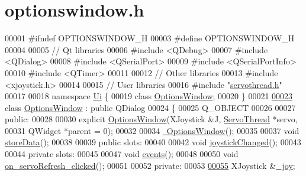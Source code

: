 \hypertarget{optionswindow_8h_source}{}\section{optionswindow.\+h}

\begin{DoxyCode}
00001 \textcolor{preprocessor}{#ifndef OPTIONSWINDOW\_H}
00003 \textcolor{preprocessor}{#define OPTIONSWINDOW\_H}
00004 
00005 \textcolor{comment}{// Qt libraries}
00006 \textcolor{preprocessor}{#include <QDebug>}
00007 \textcolor{preprocessor}{#include <QDialog>}
00008 \textcolor{preprocessor}{#include <QSerialPort>}
00009 \textcolor{preprocessor}{#include <QSerialPortInfo>}
00010 \textcolor{preprocessor}{#include <QTimer>}
00011 
00012 \textcolor{comment}{// Other libraries}
00013 \textcolor{preprocessor}{#include <xjoystick.h>}
00014 
00015 \textcolor{comment}{// User libraries}
00016 \textcolor{preprocessor}{#include "\hyperlink{servothread_8h}{servothread.h}"}
00017 
00018 \textcolor{keyword}{namespace }\hyperlink{namespace_ui}{Ui} \{
00019 \textcolor{keyword}{class }\hyperlink{class_options_window}{OptionsWindow};
00020 \}
00021 
\hypertarget{optionswindow_8h_source_l00023}{}\hyperlink{class_options_window}{00023} \textcolor{keyword}{class }\hyperlink{class_options_window}{OptionsWindow} : \textcolor{keyword}{public} QDialog
00024 \{
00025     Q\_OBJECT
00026     
00027 \textcolor{keyword}{public}:
00028     
00030     \textcolor{keyword}{explicit} \hyperlink{class_options_window_ae8e0a610d13a0478bdac57ec7cd4afba}{OptionsWindow}(XJoystick &J, \hyperlink{class_servo_thread}{ServoThread} *servo, 
00031                            QWidget *parent = 0);
00032     
00034     \hyperlink{class_options_window_a034c885fe8bb4416e732a9571d14a6b4}{~OptionsWindow}();
00035     
00037     \textcolor{keywordtype}{void} \hyperlink{class_options_window_ab0a56ad7347c20046602a7a2a1c83397}{storeData}();
00038     
00039 \textcolor{keyword}{public} slots:
00040     
00042     \textcolor{keywordtype}{void} \hyperlink{class_options_window_ae8c0373be58da710194f8d14f1c3c4dc}{joystickChanged}();
00043 
00044 \textcolor{keyword}{private} slots:
00045     
00047     \textcolor{keywordtype}{void} \hyperlink{class_options_window_a18763ff318688083c7ee5a21f22e8e98}{events}();
00048     
00050     \textcolor{keywordtype}{void} \hyperlink{class_options_window_ad5365d452e8bcd86cbb64b9ec42c3b7e}{on\_servoRefresh\_clicked}();
00051     
00052 \textcolor{keyword}{private}:
00053     
\hypertarget{optionswindow_8h_source_l00055}{}\hyperlink{class_options_window_a1bf846ab681ab245f70adac30999947c}{00055}     XJoystick &\hyperlink{class_options_window_a1bf846ab681ab245f70adac30999947c}{\_joy};

\end{DoxyCode}
